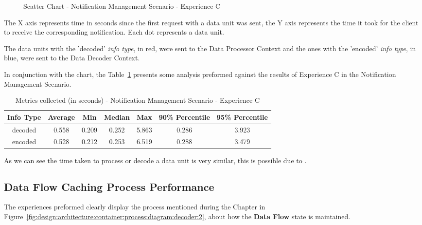 \begin{figure}[H]
    \centering
    
    \caption[Scatter Chart - Notification Management Scenario - Experience C]{Scatter Chart - Notification Management Scenario - Experience C}
    \label{fig:evaluation:overview:decoproc:chart:s3eC}
\end{figure}

The X axis represents time in seconds since the first request with a data unit was sent, the Y axis represents the time it took for the client to receive the corresponding notification. Each dot represents a data unit.

The data units with the 'decoded' \textit{info type}, in red, were sent to the Data Processor Context and the ones with the 'encoded' \textit{info type}, in blue, were sent to the Data Decoder Context.

In conjunction with the chart, the Table~\ref{tab:evaluation:overview:decoproc:results} presents some analysis preformed against the results of Experience C in the Notification Management Scenario.

\begin{table}[H]
    \caption{Metrics collected (in seconds) - Notification Management Scenario - Experience C}
    \label{tab:evaluation:overview:decoproc:results}
    \centering
    \begin{tabular}{@{}ccccccc@{}}
    \toprule
    \textbf{Info Type} & \textbf{Average} & \textbf{Min} & \textbf{Median} & \textbf{Max} & \textbf{90\% Percentile} & \textbf{95\% Percentile} \\ \midrule
    decoded & 0.558 & 0.209 & 0.252 & 5.863 & 0.286 & 3.923 \\ \midrule
    encoded & 0.528 & 0.212 & 0.253 & 6.519 & 0.288 & 3.479 \\ \bottomrule
    \end{tabular}
\end{table}

As we can see the time taken to process or decode a data unit is very similar, this is possible due to .

\subsection{Data Flow Caching Process Performance}
\label{subsubsec:evaluation:overview:cache}

The experiences preformed clearly display the process mentioned during the  Chapter in Figure~\ref{fig:design:architecture:container:process:diagram:decoder:2}, about how the \textbf{Data Flow} state is maintained. 

